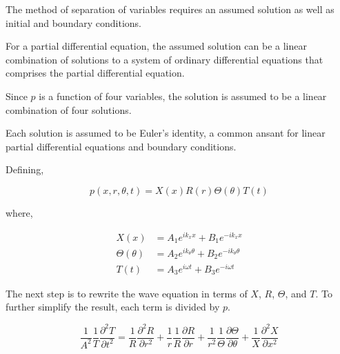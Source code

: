 \begin{frame}
    

 The method of separation of variables requires an assumed solution as well as initial and boundary 
conditions. 

For a partial differential equation, the assumed solution can be a 
linear combination of solutions to a system of ordinary differential equations that
comprises the partial differential equation. 

Since $p$ is a function of four variables, the solution is 
assumed to be a linear combination of four solutions.

Each solution is assumed to be Euler's identity, a common ansant for linear partial 
differential equations and boundary conditions.

 Defining,

\begin{equation}
    p(x,r,\theta,t) = X(x) R(r) \Theta(\theta) T(t)
\end{equation}
\end{frame}
\begin{frame}
where, 

\begin{align*}
    X(x) &=
    A_1 e^{ik_x x} +
    B_1 e^{-ik_x x }\\
    \Theta(\theta) &=
    A_2 e^{i k_{\theta} \theta } +
    B_2 e^{-ik_{\theta} \theta }\\
    T(t) &=
    A_3 e^{i \omega t } +
    B_3 e^{-i\omega t  }
\end{align*}



The next step is to rewrite the wave equation in terms of $X$, $R$, $\Theta$,
and $T$. To further simplify the result, each term is divided by $p$.

\begin{equation}
    \frac{1}{A^2} \frac{1}{T}\frac{\partial^2 T}{\partial t^2} = 
    \frac{1}{R}\frac{\partial^2 R}{\partial r^2 } +
    \frac{1}{r}\frac{1}{R}\frac{\partial R}{\partial r}  + 
    \frac{1}{r^2}\frac{1}{\Theta}\frac{\partial \Theta}{\partial \theta} + 
    \frac{1}{X}\frac{\partial^2 X}{\partial x^2}
    \label{eqn:waveode}
\end{equation}
\end{frame}
    

